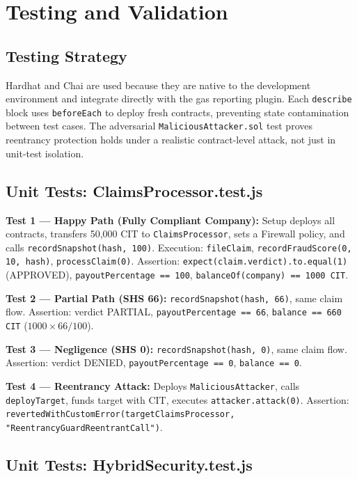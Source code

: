 \documentclass[12pt,a4paper]{article}
\begin{document}
\section{Testing and Validation}
\label{sec:testing}

\subsection{Testing Strategy}
Hardhat and Chai are used because they are native to the development
environment and integrate directly with the gas reporting plugin.
Each \texttt{describe} block uses \texttt{beforeEach} to deploy fresh
contracts, preventing state contamination between test cases.
The adversarial \texttt{MaliciousAttacker.sol} test proves reentrancy
protection holds under a realistic contract-level attack, not just in
unit-test isolation.

\subsection{Unit Tests: ClaimsProcessor.test.js}

\textbf{Test 1 --- Happy Path (Fully Compliant Company):}
Setup deploys all contracts, transfers 50,000 CIT to
\texttt{ClaimsProcessor}, sets a Firewall policy, and calls
\texttt{recordSnapshot(hash, 100)}. Execution: \texttt{fileClaim},
\texttt{recordFraudScore(0, 10, hash)}, \texttt{processClaim(0)}.
Assertion: \texttt{expect(claim.verdict).to.equal(1)} (APPROVED),
\texttt{payoutPercentage == 100}, \texttt{balanceOf(company) == 1000 CIT}.

\textbf{Test 2 --- Partial Path (SHS 66):}
\texttt{recordSnapshot(hash, 66)}, same claim flow.
Assertion: verdict PARTIAL, \texttt{payoutPercentage == 66},
\texttt{balance == 660 CIT} ($1000 \times 66 / 100$).

\textbf{Test 3 --- Negligence (SHS 0):}
\texttt{recordSnapshot(hash, 0)}, same claim flow.
Assertion: verdict DENIED, \texttt{payoutPercentage == 0},
\texttt{balance == 0}.

\textbf{Test 4 --- Reentrancy Attack:}
Deploys \texttt{MaliciousAttacker}, calls \texttt{deployTarget},
funds target with CIT, executes \texttt{attacker.attack(0)}.
Assertion: \texttt{revertedWithCustomError(targetClaimsProcessor,
"ReentrancyGuardReentrantCall")}.

\subsection{Unit Tests: HybridSecurity.test.js}
\end{document}
